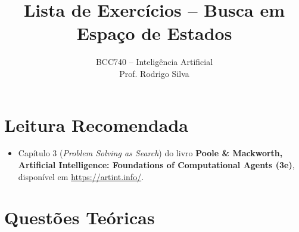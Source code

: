 \documentclass[9pt,a4paper]{extarticle}
\title{Lista de Exercícios -- Busca em Espaço de Estados}
\author{BCC740 -- Inteligência Artificial \\ Prof. Rodrigo Silva}
\date{}
\begin{document}
\maketitle

\section*{Leitura Recomendada}
\begin{itemize}
  \item Capítulo 3 (\textit{Problem Solving as Search}) do livro \textbf{Poole \& Mackworth, Artificial Intelligence: Foundations of Computational Agents (3e)}, disponível em \url{https://artint.info/}.
\end{itemize}

\section{Questões Teóricas}
\end{document}
